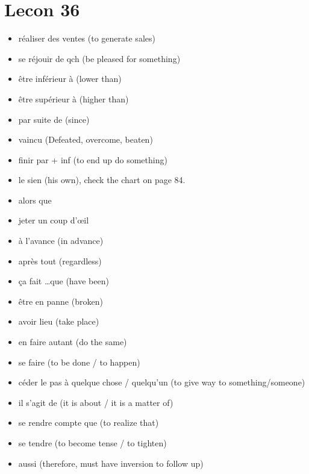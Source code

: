 \documentclass{book}
\begin{document}
\chapter{Lecon 36}
    \begin{itemize}
        \item réaliser des ventes (to generate sales)
        \item se réjouir de qch (be pleased for something)
        \item être inférieur à (lower than)
        \item être supérieur à (higher than)
        \item par suite de (since)
        \item vaincu (Defeated, overcome, beaten)
        \item finir par + inf (to end up do something)
        \item le sien (his own), check the chart on page 84.
        \item alors que %
        \item jeter un coup d'œil %
        \item à l'avance (in advance)
        \item après tout (regardless)
        \item ça fait \dots que (have been)
        \item être en panne (broken)
        \item avoir lieu (take place)
        \item en faire autant (do the same)
        \item se faire (to be done / to happen)
        \item céder le pas à quelque chose / quelqu'un (to give way to something/someone)
        \item il s'agit de (it is about / it is a matter of)
        \item se rendre compte que (to realize that)
        \item se tendre (to become tense / to tighten)
        \item aussi (therefore, must have inversion to follow up)
    \end{itemize}
\end{document}
